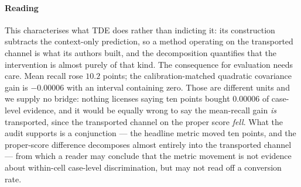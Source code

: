 \paragraph{Reading} This characterises what TDE does rather than indicting it: its
construction subtracts the context-only prediction, so a method operating on the transported
channel is what its authors built, and the decomposition quantifies that the intervention is
almost purely of that kind. The consequence for evaluation needs care. Mean recall rose
$10.2$ points; the calibration-matched quadratic covariance gain is $-0.00006$ with an
interval containing zero. Those are different units and we supply no bridge: nothing licenses
saying ten points bought $0.00006$ of case-level evidence, and it would be equally wrong to
say the mean-recall gain \emph{is} transported, since the transported channel on the proper
score \emph{fell}. What the audit supports is a conjunction --- the headline metric moved ten
points, and the proper-score difference decomposes almost entirely into the transported
channel --- from which a reader may conclude that the metric movement is not evidence about
within-cell case-level discrimination, but may not read off a conversion rate.

\begin{table}[t]
\centering
\caption{WAGER audit of released checkpoints on the canonical VG150 PredCls split:
MOTIFS-TDE against the MOTIFS-SUM baseline it debiases, both evaluated with the
original authors' code. Raw rows use all identified relations; the calibration-matched
rows fit each model's temperature on a held-out half of the images and audit the
disjoint half. CI is image-cluster robust on $\widehat{\Delta R}$.}
\label{tab:sggaudit}
\end{table}

